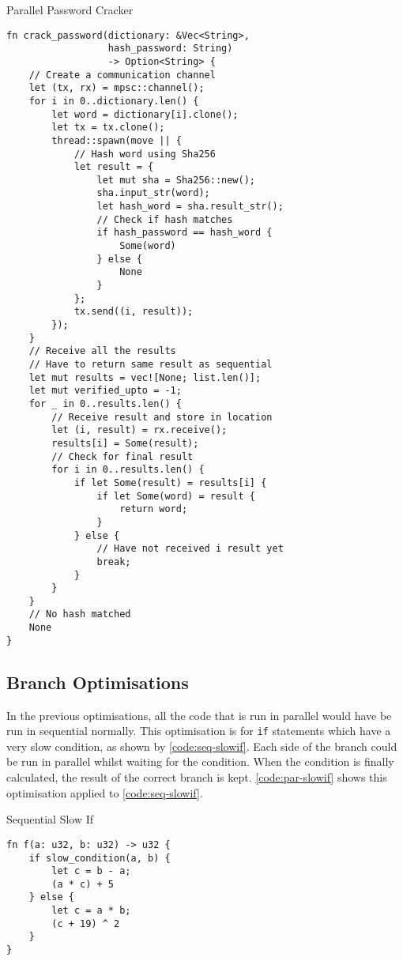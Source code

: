 \documentclass[conference]{IEEEtran}
\begin{document}
\begin{algorithm}
\caption{Parallel Password Cracker}
\label{code:par-password}
\begin{verbatim}
fn crack_password(dictionary: &Vec<String>,
                  hash_password: String)
                  -> Option<String> {
    // Create a communication channel
    let (tx, rx) = mpsc::channel();
    for i in 0..dictionary.len() {
        let word = dictionary[i].clone();
        let tx = tx.clone();
        thread::spawn(move || {
            // Hash word using Sha256
            let result = {
                let mut sha = Sha256::new();
                sha.input_str(word);
                let hash_word = sha.result_str();
                // Check if hash matches
                if hash_password == hash_word {
                    Some(word)
                } else {
                    None
                }
            };
            tx.send((i, result));
        });
    }
    // Receive all the results
    // Have to return same result as sequential
    let mut results = vec![None; list.len()];
    let mut verified_upto = -1;
    for _ in 0..results.len() {
        // Receive result and store in location
        let (i, result) = rx.receive();
        results[i] = Some(result);
        // Check for final result
        for i in 0..results.len() {
            if let Some(result) = results[i] {
                if let Some(word) = result {
                    return word;
                }
            } else {
                // Have not received i result yet
                break;
            }
        }
    }
    // No hash matched
    None
}
\end{verbatim}
\end{algorithm}

\subsection{Branch Optimisations}
In the previous optimisations, all the code that is run in parallel would have be run in sequential normally. This optimisation is for \texttt{if} statements which have a very slow condition, as shown by \autoref{code:seq-slowif}. Each side of the branch could be run in parallel whilst waiting for the condition. When the condition is finally calculated, the result of the correct branch is kept. \autoref{code:par-slowif} shows this optimisation applied to \autoref{code:seq-slowif}.

\begin{algorithm}
\caption{Sequential Slow If}
\label{code:seq-slowif}
\begin{verbatim}
fn f(a: u32, b: u32) -> u32 {
    if slow_condition(a, b) {
        let c = b - a;
        (a * c) + 5
    } else {
        let c = a * b;
        (c + 19) ^ 2
    }
}
\end{verbatim}
\end{algorithm}
\end{document}
